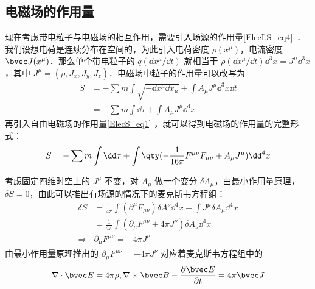 \subsection{电磁场的作用量}
现在考虑带电粒子与电磁场的相互作用，需要引入场源的作用量\autoref{ElecLS_eq4}~．我们设想电荷是连续分布在空间的，为此引入电荷密度 $\rho(x^\mu)$，电流密度 $\bvec J(x^\mu)$．那么单个带电粒子的 $q(\dd x^\mu/\dd t)$ 就相当于 $\rho (\dd x^\mu / \dd t) {\dd} ^3 x=J^\mu {\dd}^3 x$，其中 $J^\mu=(\rho,J_x,J_y,J_z)$．电磁场中粒子的作用量可以改写为
\begin{equation}
\begin{aligned}
S&=-\sum{m\int \sqrt{-\dd x^\mu \dd x_\mu}}+\int A_\mu J^\mu {\dd}^3 x\dd t\\
&=-\sum{m\int \dd \tau}+\int A_\mu J^\mu {\dd}^4 x
\end{aligned}
\end{equation}
再引入自由电磁场的作用量\autoref{ElecS_eq1} ，就可以得到电磁场的作用量的完整形式：
\begin{equation}\label{ElecS_eq2}
S=-\sum{m\int \dd \tau}+\int \qty(-\frac{1}{16\pi}F^{\mu\nu}F_{\mu\nu}+A_\mu J^\mu ){\dd}^4 x
\end{equation}

考虑固定四维时空上的 $J^\mu$ 不变，对 $A_\mu$ 做一个变分 $\delta A_\mu$，由最小作用量原理，$\delta S=0$，由此可以推出有场源的情况下的麦克斯韦方程组：
\begin{equation}
\begin{aligned}
\delta S&=\frac{1}{4\pi}\int (\partial^\mu F_{\mu\nu})\delta A^\nu {\dd}^4 x +\int J^\mu \delta A_\mu {\dd}^4 x\\
&=\frac{1}{4\pi}\int (\partial_\mu F^{\mu\nu}+4\pi J^\nu)\delta A_\nu {\dd}^4 x\\
\Rightarrow &\partial_\mu F^{\mu\nu}=-4\pi J^\nu
\end{aligned}
\end{equation}
由最小作用量原理推出的 $\partial_\mu F^{\mu\nu}=-4\pi J^\nu$ 对应着麦克斯韦方程组中的
\begin{equation}
\nabla \cdot \bvec E=4\pi \rho,\nabla\times \bvec B-\frac{\partial \bvec E}{\partial t}=4\pi \bvec J
\end{equation}